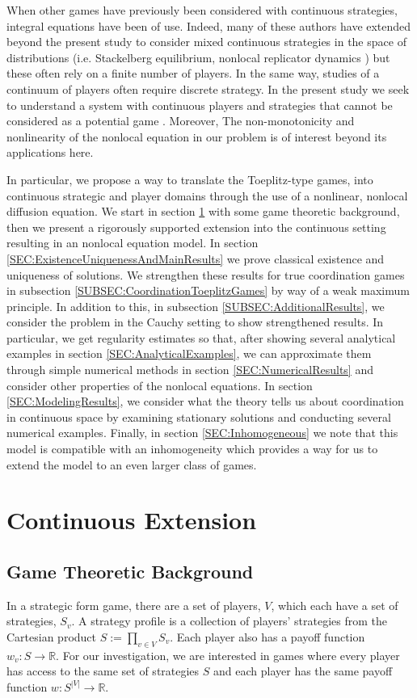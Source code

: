 \documentclass[aps,
preprint,
groupedaddress,
showkeys,
amsmath]{revtex4-2}
\begin{document}
When other games have previously been considered with continuous strategies, integral equations have been of use. Indeed, many of these authors have extended beyond the present study to consider mixed continuous strategies in the space of distributions (i.e. Stackelberg equilibrium, nonlocal replicator dynamics \cite{Kavallaris2018}) but these often rely on a finite number of players. In the same way, studies of a continuum of players often require discrete strategy. In the present study we seek to understand a system with continuous players and strategies that cannot be considered as a potential game \cite{SANDHOLM2001, Quang2016}. Moreover, The non-monotonicity and nonlinearity of the nonlocal equation in our problem is of interest beyond its applications here.  

In particular, we propose a way to translate the Toeplitz-type games, into continuous strategic and player domains through the use of a nonlinear, nonlocal diffusion equation. We start in section \ref{SEC:Extension} with some game theoretic background, then we present a rigorously supported extension into the continuous setting resulting in an nonlocal equation model. In section \ref{SEC:ExistenceUniquenessAndMainResults} we prove classical existence and uniqueness of solutions. We strengthen these results for true coordination games in subsection \ref{SUBSEC:CoordinationToeplitzGames} by way of a weak maximum principle. In addition to this, in subsection \ref{SUBSEC:AdditionalResults}, we consider the problem in the Cauchy setting to show strengthened results. In particular, we get regularity estimates so that, after showing several analytical examples in section \ref{SEC:AnalyticalExamples}, we can approximate them through simple numerical methods in section \ref{SEC:NumericalResults} and consider other properties of the nonlocal equations. In section \ref{SEC:ModelingResults}, we consider what the theory tells us about coordination in continuous space by examining stationary solutions and conducting several numerical examples. Finally, in section \ref{SEC:Inhomogeneous} we note that this model is compatible with an inhomogeneity which provides a way for us to extend the model to an even larger class of games. 

\section{Continuous Extension}\label{SEC:Extension}
\subsection{Game Theoretic Background}\label{SUBSEC:GameTheoreticBackground}
In a strategic form game, there are a set of players, $V$, which each have a set of strategies, $S_v$. A strategy profile is a collection of players' strategies from the Cartesian product $S:=\prod_{v\in V}S_v$. Each player also has a payoff function $w_v:S\rightarrow \mathbb{R}$. For our investigation, we are interested in games where every player has access to the same set of strategies $S$ and each player has the same payoff function $w:S^{|V|}\rightarrow \mathbb{R}$. 
\end{document}
